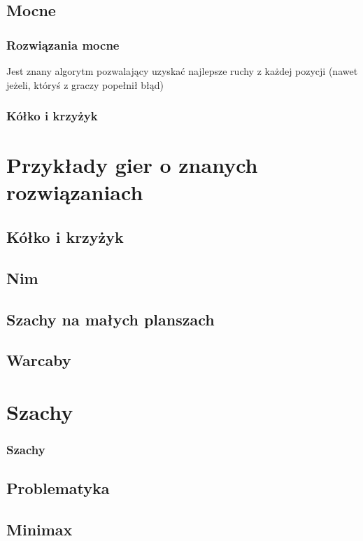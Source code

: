 \documentclass[polish,envcountsect,10pt]{beamer}
\begin{document}
        \subsection{Mocne}
            \begin{frame}
                \frametitle{Rozwiązania mocne}
                Jest znany algorytm pozwalający uzyskać najlepsze ruchy z każdej pozycji (nawet jeżeli, któryś z graczy popełnił błąd)
            \end{frame}
            \begin{frame}
                \frametitle{Kółko i krzyżyk}
            \end{frame}
    \section{Przykłady gier o znanych rozwiązaniach}
            \subsection{Kółko i krzyżyk}
            \subsection{Nim}
            \subsection{Szachy na małych planszach}
            \subsection{Warcaby}
    \section{Szachy}
        \begin{frame}
            \frametitle{Szachy}
        \end{frame}
        \subsection{Problematyka}
            \begin{frame}
               \frametitle{} 
            \end{frame}
        \subsection{Minimax}
            \begin{frame}
                
            \end{frame}
\end{document}

